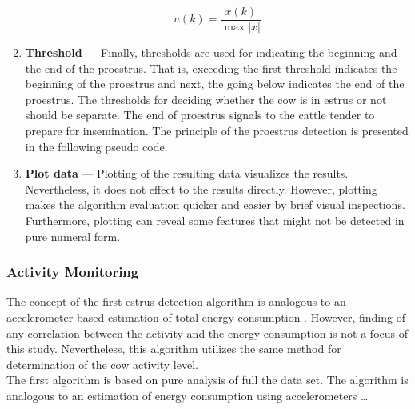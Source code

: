 \documentclass[english,12pt,a4paper,pdftex,elec,utf8]{aaltothesis}
\newcommand{\Clanguage}{\lstset{
  language=C++,                %
  basicstyle=\ttfamily,
  title=\lstname,                 %
}}
\begin{document}
\begin{enumerate}
\begin{equation}
u(k) = \frac{x(k)}{\max  \left| x \right|} 
\end{equation}


\item \textbf{Threshold} --- Finally, thresholds are used for indicating the beginning and the end of the proestrus. That is, exceeding the first threshold indicates the beginning of the proestrus and next, the going below indicates the end of the proestrus. The thresholds for deciding whether the cow is in estrus or not should be separate. The end of proestrus signals to the cattle tender to prepare for insemination. The principle of the proestrus detection is presented in the following pseudo code.  \\


\item \textbf{Plot data} --- Plotting of the resulting data visualizes the results. Nevertheless, it does not effect to the results directly. However, plotting makes the algorithm evaluation quicker and easier by brief visual inspections. Furthermore, plotting can reveal some features that might not be detected in pure numeral form.

\end{enumerate}


\subsubsection{Activity Monitoring} \label{activitymeasurementsection}

The concept of the first estrus detection algorithm is analogous to an accelerometer based estimation of total energy consumption \cite{Kang2012}. However, finding of any correlation between the activity and the energy consumption is not a focus of this study. Nevertheless, this algorithm utilizes the same method for determination of the cow activity level. \\


The first algorithm is based on pure analysis of full the data set. The algorithm is analogous to an estimation of energy consumption using accelerometers   \dots \\
\end{document}
